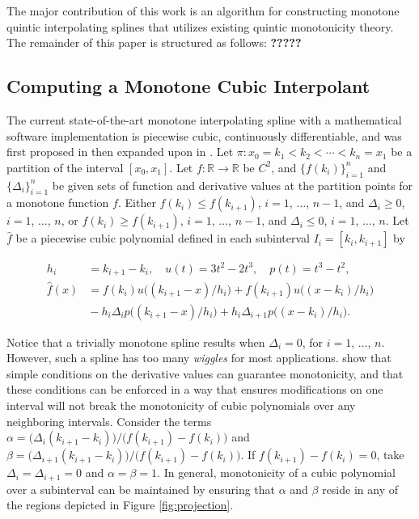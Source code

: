\documentclass{scspaperproc}
\theoremstyle{scsthe}
\begin{document}

The major contribution of this work is an algorithm for constructing monotone quintic interpolating splines that utilizes existing quintic monotonicity theory. The remainder of this paper is structured as follows: {\bf ?????}


\subsection{Computing a Monotone Cubic Interpolant}

The current state-of-the-art monotone interpolating spline with a mathematical software implementation is piecewise cubic, continuously differentiable, and was first proposed in \cite{fritsch1980monotone} then expanded upon in \cite{carlson1985monotone}. Let $\pi: x_0 = k_1 < k_2 < \cdots < k_n = x_1$ be a partition of the interval $[x_0,x_1]$. Let $f: \mathbb{R} \rightarrow \mathbb{R}$ be $C^2$, and $\bigl\{f(k_i)\bigr\}_{i=1}^n$ and $\bigl\{\Delta_i\bigr\}_{i=1}^n$ be given sets of function and derivative values at the partition points for a monotone function $f$. Either $f(k_i) \leq f(k_{i+1})$, $i=1$, $\ldots$, $n-1$, and $\Delta_i\ge0$, $i=1$, $\ldots$, $n$, or $f(k_i) \geq f(k_{i+1})$, $i=1$, $\ldots$, $n-1$, and $\Delta_i\le0$, $i=1$, $\ldots$, $n$. Let $\hat f$ be a piecewise cubic polynomial defined in each subinterval $I_i = [k_i, k_{i+1}]$ by

\begin{align*}
h_i &= k_{i+1} - k_{i}, \quad
u(t) = 3t^2 - 2t^3, \quad
p(t) = t^3 - t^2,\\
\hat f(x) &= f(k_i) u\big((k_{i+1} - x) / h_i\big) +
f(k_{i+1}) u\big((x - k_i) / h_i\big) \\
&{} - h_i\Delta_i p\big((k_{i+1}-x)/h_i\big) + h_i\Delta_{i+1}
p\big((x-k_i)/h_i\big).
\end{align*}

Notice that a trivially monotone spline results when $\Delta_i = 0$, for $i = 1$, $\ldots$, $n$. However, such a spline has too many \textit{wiggles} for most applications.  show that simple conditions on the derivative values can guarantee monotonicity, and that these conditions can be enforced in a way that ensures modifications on one interval will not break the monotonicity of cubic polynomials over any neighboring intervals. Consider the terms $\alpha = \big(\Delta_i (k_{i+1}-k_i)\big) / \big(f(k_{i+1}) - f(k_i)\big)$ and $\beta = \big(\Delta_{i+1}(k_{i+1}-k_i)\big) / \big(f(k_{i+1}) - f(k_i)\big)$. If $f(k_{i+1}) - f(k_i)=0$, take $\Delta_i = \Delta_{i+1} =0$ and $\alpha =\beta =1$. In general, monotonicity of a cubic polynomial over a subinterval can be maintained by ensuring that $\alpha$ and $\beta$ reside in any of the regions depicted in Figure \ref{fig:projection}.
\end{document}
